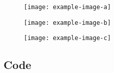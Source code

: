 \begin{figure}[H]
    \centering
    \begin{minipage}{0.3\textwidth}
        \centering
        \texttt{[image: example-image-a]}
        \label{fig: style 2 image a}
    \end{minipage}
    \hfill
    \begin{minipage}{0.3\textwidth}
        \centering
        \texttt{[image: example-image-b]}
        \label{fig: style 2 image b}
    \end{minipage}
    \hfill
    \begin{minipage}{0.3\textwidth}
        \centering
        \texttt{[image: example-image-c]}
        \label{fig: style 2 image c}
    \end{minipage}
\end{figure}

\newpage

\subsection{Code}

